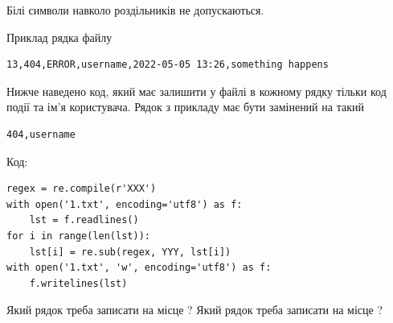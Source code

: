 \documentclass[12pt, ukrainian]{article}
\begin{document}
{Білі символи навколо роздільників не допускаються.

Приклад рядка файлу



\begin{verbatim}
13,404,ERROR,username,2022-05-05 13:26,something happens
\end{verbatim}


Нижче наведено код, який має залишити у файлі в кожному рядку тільки код події та ім'я користувача. Рядок з прикладу має бути замінений на такий



\begin{verbatim}
404,username
\end{verbatim}




Код:



\begin{verbatim}
regex = re.compile(r'XXX')
with open('1.txt', encoding='utf8') as f:
    lst = f.readlines()
for i in range(len(lst)):
    lst[i] = re.sub(regex, YYY, lst[i])
with open('1.txt', 'w', encoding='utf8') as f:
    f.writelines(lst)
\end{verbatim}





Який рядок треба записати на місце  ?
Який рядок треба записати на місце  ?\par

}
\end{document}

